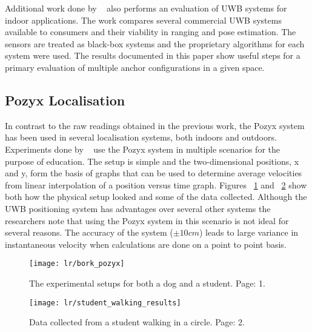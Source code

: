 Additional work done by ~\citet{di2019evaluation} also performs an evaluation of UWB systems for indoor applications.
The work compares several commercial UWB systems available to consumers and their viability in ranging and pose estimation.
The sensors are treated as black-box systems and the proprietary algorithms for each system were used.
The results documented in this paper show useful steps for a primary evaluation of multiple anchor configurations in a given space.

\subsection{Pozyx Localisation}\label{subsec:pozyx-localisation}
In contrast to the raw readings obtained in the previous work, the Pozyx system has been used in several localisation systems, both indoors and outdoors.
Experiments done by ~\citet{destefano2019using} use the Pozyx system in multiple scenarios for the purpose of education.
The setup is simple and the two-dimensional positions, x and y, form the basis of  graphs that can be used to determine average velocities from linear interpolation of a position versus time graph.
Figures ~\ref{fig:bpozyx} and ~\ref{fig:stupozyx} show both how the physical setup looked and some of the data collected.
Although the UWB positioning system has advantages over several other systems the researchers note that using the Pozyx system in this scenario is not ideal for several reasons.
The accuracy of the system ($\pm10cm$) leads to large variance in instantaneous velocity when calculations are done on a point to point basis.

\begin{figure}[h!]
    \centering
    \texttt{[image: lr/bork\_pozyx]}
    \caption{The experimental setups for both a dog and a student. \cite{destefano2019using} Page: 1.}
    \label{fig:bpozyx}
\end{figure}

\begin{figure}[h!]
    \centering
    \texttt{[image: lr/student\_walking\_results]}
    \caption{Data collected from a student walking in a circle. \cite{destefano2019using} Page: 2.}
    \label{fig:stupozyx}
\end{figure}

